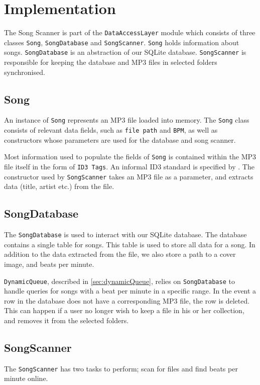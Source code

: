 \section{Implementation}
The Song Scanner is part of the \texttt{DataAccessLayer} module which consists of three classes \texttt{Song}, \texttt{SongDatabase} and \texttt{SongScanner}. \texttt{Song} holds information about songs. \texttt{SongDatabase} is an abstraction of our SQLite database. \texttt{SongScanner} is responsible for keeping the database and MP3 files in selected folders synchronised.

\subsection{Song}
An instance of \texttt{Song} represents an MP3 file loaded into memory. The \texttt{Song} class consists of relevant data fields, such as \texttt{file path} and \texttt{BPM}, as well as constructors whose parameters are used for the database and song scanner. 

Most information used to populate the fields of \texttt{Song} is contained within the MP3 file itself in the form of \texttt{ID3 Tags}. An informal ID3 standard is specified by \citet{ID3:standard}. The constructor used by \texttt{SongScanner} takes an MP3 file as a parameter, and extracts data (title, artist etc.) from the file.

\subsection{SongDatabase}
The \texttt{SongDatabase} is used to interact with our SQLite database. The database contains a single table for songs. This table is used to store all data for a song. In addition to the data extracted from the file, we also store a path to a cover image, and beats per minute.

\texttt{DynamicQueue}, described in \cref{sec:dynamicQueue}, relies on \texttt{SongDatabase} to handle queries for songs with a beat per minute in a specific range. In the event a row in the database does not have a corresponding MP3 file, the row is deleted. This can happen if a user no longer wish to keep a file in his or her collection, and removes it from the selected folders. 

\subsection{SongScanner} 
The \texttt{SongScanner} has two tasks to perform; scan for files and find beats per minute online.

